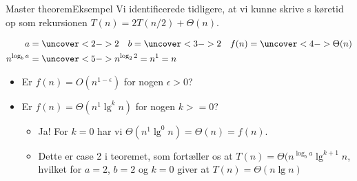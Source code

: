 \documentclass[aspectratio=1610]{beamer}
\begin{document}
\begin{frame}{Master theorem}{Eksempel}
    Vi identificerede tidligere, at vi kunne skrive s køretid
    op som rekursionen $T(n) = 2T(n/2) + \Theta(n)$. 

    \begin{align*}
        a&=\uncover<2->{2} \quad b=\uncover<3->{2} \quad
        f(n)=\uncover<4->{\Theta(n)} \\
        n^{\log_b a}&=\uncover<5->{n^{\log_2 2} = n^{1} = n} \\
    \end{align*}

    \begin{itemize}
        \item<6-> Er $f(n) = O(n^{1 - \epsilon})$ for nogen $\epsilon > 0$?
        \item<7-> Er $f(n) = \Theta(n^{1}\lg^k n)$ for nogen $k >= 0$?
            \begin{itemize}
                \item<8-> Ja! For $k = 0$ har vi $\Theta(n^{1}\lg^{0}n) =
                    \Theta(n) = f(n)$.
                \pause
                \item<9-> Dette er \alert{case 2} i teoremet, som fortæller os at
                    $T(n) = \Theta(n^{\log_b a}\lg^{k+1}n$, hvilket for $a=2$,
                    $b=2$ og $k=0$ giver at $T(n) = \Theta(n \lg n)$
            \end{itemize}
    \end{itemize}
\end{frame}
\end{document}
